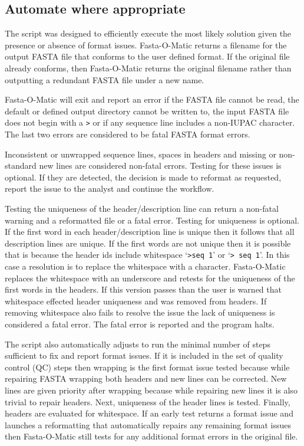\documentclass{bmcart}
\begin{document}
\subsection{Automate where appropriate} 

The script was designed to efficiently execute the most likely solution given the presence or absence of format issues. Fasta-O-Matic returns a filename for the output FASTA file that conforms to the user defined format. If the original file already conforms, then Fasta-O-Matic returns the original filename rather than outputting a redundant FASTA file under a new name.

Fasta-O-Matic will exit and report an error if the FASTA file cannot be read, the default or defined output directory cannot be written to, the input FASTA file does not begin with a \verb|>| or if any sequence line includes a non-IUPAC character. The last two errors are considered to be fatal FASTA format errors.

Inconsistent or unwrapped sequence lines, spaces in headers and missing or non-standard new lines are considered non-fatal errors. Testing for these issues is optional. If they are detected, the decision is made to reformat as requested, report the issue to the analyst and continue the workflow.

Testing the uniqueness of the header/description line can return a non-fatal warning and a reformatted file or a fatal error. Testing for uniqueness is optional. If the first word in each header/description line is unique then it follows that all description lines are unique. If the first words are not unique then it is possible that is because the header ids include whitespace `\verb|>seq 1|' or `\verb|> seq 1|'. In this case a resolution is to replace the whitespace with a character. Fasta-O-Matic replaces the whitespace with an underscore and retests for the uniqueness of the first words in the headers. If this version passes than the user is warned that whitespace effected header uniqueness and was removed from headers. If removing whitespace also fails to resolve the issue the lack of uniqueness is considered a fatal error. The fatal error is reported and the program halts.

The script also automatically adjusts to run the minimal number of steps sufficient to fix and report format issues. If it is included in the set of quality control (QC) steps then wrapping is the first format issue tested because while repairing FASTA wrapping both headers and new lines can be corrected. New lines are given priority after wrapping because while repairing new lines it is also trivial to repair headers. Next, uniqueness of the header lines is tested. Finally, headers are evaluated for whitespace. If an early test returns a format issue and launches a reformatting that automatically repairs any remaining format issues then Fasta-O-Matic still tests for any additional format errors in the original file. 
\end{document}
